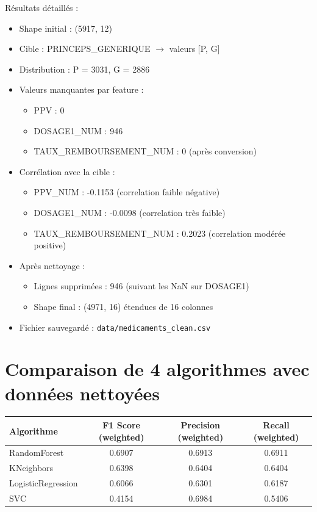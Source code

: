 \documentclass[12pt,a4paper]{report}
\begin{document}
Résultats détaillés :
\begin{itemize}
    \item Shape initial : (5917, 12)
    \item Cible : PRINCEPS\_GENERIQUE $\rightarrow$ valeurs [P, G]
    \item Distribution : P = 3031, G = 2886
    \item Valeurs manquantes par feature :
    \begin{itemize}
        \item PPV : 0
        \item DOSAGE1\_NUM : 946
        \item TAUX\_REMBOURSEMENT\_NUM : 0 (après conversion)
    \end{itemize}
    \item Corrélation avec la cible :
    \begin{itemize}
        \item PPV\_NUM : -0.1153 (correlation faible négative)
        \item DOSAGE1\_NUM : -0.0098 (correlation très faible)
        \item TAUX\_REMBOURSEMENT\_NUM : 0.2023 (correlation modérée positive)
    \end{itemize}
    \item Après nettoyage :
    \begin{itemize}
        \item Lignes supprimées : 946 (suivant les NaN sur DOSAGE1)
        \item Shape final : (4971, 16) étendues de 16 colonnes
    \end{itemize}
    \item Fichier sauvegardé : \texttt{data/medicaments\_clean.csv}
\end{itemize}

\section{Comparaison de 4 algorithmes avec données nettoyées}
\begin{table}[h!]
\centering
\begin{tabular}{lccc}
\hline
\textbf{Algorithme} & \textbf{F1 Score (weighted)} & \textbf{Precision (weighted)} & \textbf{Recall (weighted)} \\
\hline
RandomForest & 0.6907 & 0.6913 & 0.6911 \\
KNeighbors & 0.6398 & 0.6404 & 0.6404 \\
LogisticRegression & 0.6066 & 0.6301 & 0.6187 \\
SVC & 0.4154 & 0.6984 & 0.5406 \\
\hline
\end{tabular}
\end{table}
\end{document}
